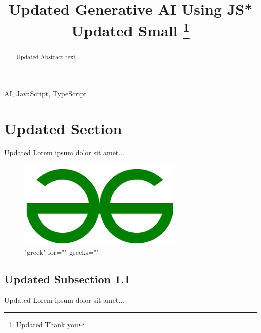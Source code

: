 \documentclass[conference]{IEEEtran}%
\begin{document}
%
\normalsize%
\title{Updated Generative AI Using JS*\\
    {\footnotesize Updated Small}
    \thanks{Updated Thank you}
    }%
\author{
}%
\maketitle%
\begin{abstract}%
Updated Abstract text%
\end{abstract}%
\begin{IEEEkeywords}%
AI, JavaScript, TypeScript%
\end{IEEEkeywords}%
\section{Updated Section}%
\label{sec:UpdatedSection}%
Updated Lorem ipsum dolor sit amet...
    \begin{figure}[htbp] 
    \centerline{\includegraphics[width=\linewidth]{image_1.png}}
    \caption{"greek" for="" greeks=""}
    \label{fig:image_1.png}
    \end{figure}%
\subsection{Updated Subsection 1.1}%
\label{subsec:UpdatedSubsection1.1}%
Updated  Lorem ipsum dolor sit amet...

%
%
%
\end{document}
